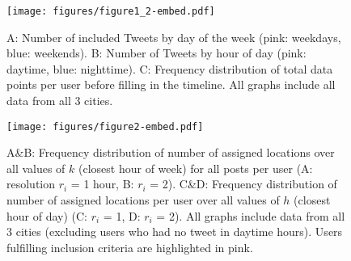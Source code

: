 

\begin{figure}[t]
\centering
\texttt{[image: figures/figure1\_2-embed.pdf]}
\caption{A: Number of included Tweets by day of the week (pink: weekdays, blue: weekends). B: Number of Tweets by hour of day (pink: daytime, blue: nighttime). C: Frequency distribution of total data points per user before filling in the timeline. All graphs include all data from all 3 cities.}
\label{data_breakdown}
\end{figure}

\begin{figure}[]
\centering
\texttt{[image: figures/figure2-embed.pdf]}
\caption{A\&B: Frequency distribution of number of assigned locations over all values of $k$ (closest hour of week) for all posts per user (A: resolution $r_i$ = 1 hour, B: $r_i$ = 2). C\&D: Frequency distribution of number of assigned locations per user over all values of $h$ (closest hour of day) (C: $r_i$ = 1, D: $r_i$ = 2). All graphs include data from all 3 cities (excluding users who had no tweet in daytime hours). Users fulfilling inclusion criteria are highlighted in pink.}
\label{data_distrib_k}
\end{figure}

